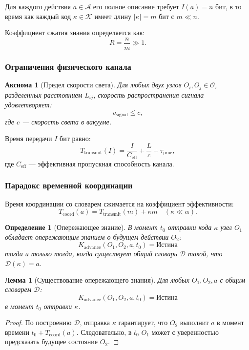 \documentclass[11pt,a4paper]{article}
\newtheorem{lemma}{Лемма}
\newtheorem{axiom}{Аксиома}
\newtheorem{definition}{Определение}
\begin{document}
	Для каждого действия $a \in \mathcal{A}$ его полное описание требует $I(a) = n$ бит, в то время как каждый код $\kappa \in \mathcal{K}$ имеет длину $|\kappa| = m$ бит с $m \ll n$.
	
	Коэффициент сжатия знания определяется как:
	\[
	R = \frac{n}{m} \gg 1.
	\]
	
	\subsubsection{Ограничения физического канала}
	
	\begin{axiom}[Предел скорости света]
		Для любых двух узлов $O_i, O_j \in \mathcal{O}$, разделенных расстоянием $L_{ij}$, скорость распространения сигнала удовлетворяет:
		\[
		v_{\text{signal}} \leq c,
		\]
		где $c$ — скорость света в вакууме.
	\end{axiom}
	
	Время передачи $I$ бит равно:
	\[
	T_{\text{transmit}}(I) = \frac{I}{C_{\text{eff}}} + \frac{L}{c} + \tau_{\text{proc}},
	\]
	где $C_{\text{eff}}$ — эффективная пропускная способность канала.
	
	\subsubsection{Парадокс временной координации}
	
	Время координации со словарем сжимается на коэффициент эффективности:
	\[
	T_{\text{coord}}(a) = T_{\text{transmit}}(m) + \kappa m \quad (\kappa \ll \alpha).
	\]
	
	\begin{definition}[Опережающее знание]
		В момент $t_0$ отправки кода $\kappa$ узел $O_1$ обладает опережающим знанием о будущем действии $O_2$:
		\[
		K_{\text{advance}}(O_1, O_2, a, t_0) = \text{Истина}
		\]
		тогда и только тогда, когда существует общий словарь $\mathcal{D}$ такой, что $\mathcal{D}(\kappa) = a$.
	\end{definition}
	
	\begin{lemma}[Существование опережающего знания]
		\label{lem:advance-knowledge}
		Для любых $O_1, O_2, a$ с общим словарем $\mathcal{D}$:
		\[
		K_{\text{advance}}(O_1, O_2, a, t_0) = \text{Истина}
		\]
		в момент $t_0$ отправки $\kappa$.
	\end{lemma}
	
	\begin{proof}
		По построению $\mathcal{D}$, отправка $\kappa$ гарантирует, что $O_2$ выполнит $a$ в момент времени $t_0 + T_{\text{coord}}(a)$. Следовательно, в $t_0$ $O_1$ может с уверенностью предсказать будущее состояние $O_2$.
	\end{proof}
	
\end{document}
